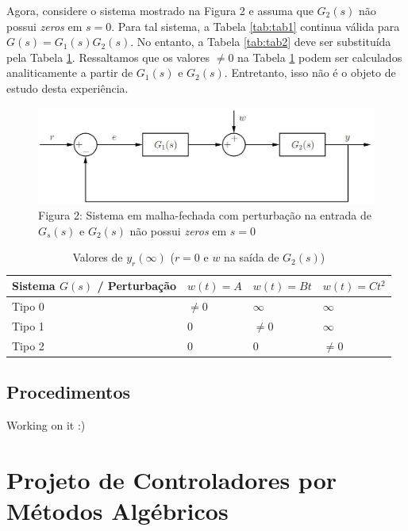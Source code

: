 \documentclass[
]{book}
\begin{document}
Agora, considere o sistema mostrado na Figura 2 e assuma que \(G_2(s)\) não possui \emph{zeros} em \(s=0\). Para tal sistema, a Tabela \ref{tab:tab1} continua válida para \(G(s) = G_1(s)G_2(s)\). No entanto, a Tabela \ref{tab:tab2} deve ser substituída pela Tabela \ref{tab:tab3}. Ressaltamos que os valores \(\neq 0\) na Tabela \ref{tab:tab3} podem ser calculados analiticamente a partir de \(G_1(s) \text{ e } G_2(s)\). Entretanto, isso não é o objeto de estudo desta experiência.

\begin{figure}
\centering
\includegraphics{Imagens/Lab4/Apresentação/fig2.jpg}
\caption{Figura 2: Sistema em malha-fechada com perturbação na entrada de \(G_s(s)\) e \(G_2(s)\) não possui \emph{zeros} em \(s=0\)}
\end{figure}

\begin{table}

\caption{\label{tab:tab3}Valores de $y_r(\infty)$ ($r=0$ e $w$ na saída de $G_2(s)$)}
\centering
\begin{tabular}[t]{llll}
\toprule
Sistema $G(s)$ / Perturbação & $w(t)=A$ & $w(t) = Bt$ & $w(t) = Ct^2$\\
\midrule
Tipo 0 & $\neq 0$ & $\infty$ & $\infty$\\
Tipo 1 & 0 & $\neq 0$ & $\infty$\\
Tipo 2 & 0 & 0 & $\neq 0$\\
\bottomrule
\end{tabular}
\end{table}

\hypertarget{procedimentos-2}{%
\section{Procedimentos}\label{procedimentos-2}}

Working on it :)

\hypertarget{projeto-de-controladores-por-muxe9todos-alguxe9bricos}{%
\chapter{Projeto de Controladores por Métodos Algébricos}\label{projeto-de-controladores-por-muxe9todos-alguxe9bricos}}
\end{document}

